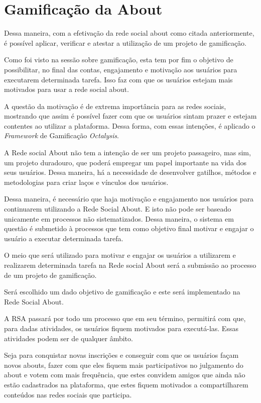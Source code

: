 \section{Gamificação da About}
\label{sub:gamifição}
Dessa maneira, com a efetivação da rede social about como citada anteriormente, é possível aplicar, verificar e
atestar a utilização de um projeto de gamificação.

Como foi visto na sessão sobre gamificação, esta tem por fim o objetivo de 
possibilitar, no final das contas, engajamento e motivação aos usuários para
executarem determinada tarefa. Isso faz com que os usuários estejam mais
motivados para usar a rede social about. 

A questão da motivação é de extrema importância para as redes sociais, mostrando
que assim é possível fazer com que os usuários sintam prazer e estejam
contentes ao utilizar a plataforma. Dessa forma, com essas intenções,
é aplicado o \textit{Framework} de Gamificação \textit{Octalysis}.

A Rede social About não tem a intenção de ser um projeto passageiro, mas sim,
um projeto duradouro, que poderá empregar um papel importante na vida dos
seus usuários. Dessa maneira, há a necessidade de desenvolver gatilhos, métodos
e metodologias para criar laços e vínculos dos usuários.

Dessa maneira, é necessário que haja motivação e engajamento nos usuários para 
continuarem utilizando a Rede Social About. E isto não pode ser baseado unicamente
em processos não sistematizados. Dessa maneira, o sistema em questão é 
submetido à processos que tem como objetivo final motivar e engajar o usuário
a executar determinada tarefa.

O meio que será utilizado para motivar e engajar os usuários a utilizarem e
realizarem determinada tarefa na Rede social About será a submissão ao processo
de um projeto de gamificação. 

Será escolhido um dado objetivo de gamificação e este será implementado na Rede
Social About.

A RSA passará por todo um processo que em seu término, permitirá com que,
para dadas atividades, os usuários fiquem motivados para executá-las. Essas
atividades podem ser de qualquer âmbito. 

Seja para conquistar novas inscrições e
conseguir com que os usuários façam novos abouts, fazer com que eles fiquem mais
participativos no julgamento do about e votem com mais frequência, que estes
convidem amigos que ainda não estão cadastrados na plataforma, que estes fiquem
motivados a compartilharem conteúdos nas redes sociais que participa.

